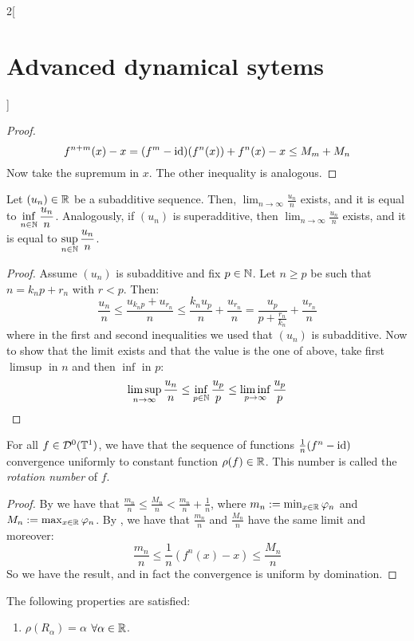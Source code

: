 \documentclass[../../../main_math.tex]{subfiles}
\begin{document}
\begin{multicols}{2}[\section{Advanced dynamical sytems}]
\begin{proof}
\begin{equation*}
      f^{n+m}(x)-x=(f^m-\mathrm{id})(f^n(x))+f^n(x)-x\leq M_m+M_n
    \end{equation*}
    Now take the supremum in $x$. The other inequality is analogous.
  \end{proof}
  \begin{lemma}\label{ADS:lema3}
    Let $(u_n)\in\mathbb{R}$ be a subadditive sequence. Then, $\displaystyle\lim_{n\to\infty}\frac{u_n}{n}$ exists, and it is equal to $\displaystyle\inf_{n\in\mathbb{N}}\frac{u_n}{n}$. Analogously, if $(u_n)$ is superadditive, then $\displaystyle\lim_{n\to\infty}\frac{u_n}{n}$ exists, and it is equal to $\displaystyle\sup_{n\in\mathbb{N}}\frac{u_n}{n}$.
  \end{lemma}
  \begin{proof}
    Assume $(u_n)$ is subadditive and fix $p\in\mathbb{N}$. Let $n\geq p$ be such that $n=k_np+r_n$ with $r<p$. Then:
    $$
      \frac{u_n}{n}\leq \frac{u_{k_np}+u_{r_n}}{n}\leq \frac{k_nu_p}{n}+\frac{u_{r_n}}{n}=\frac{u_p}{p+\frac{r_n}{k_n}}+\frac{u_{r_n}}{n}
    $$
    where in the first and second inequalities we used that $(u_n)$ is subadditive. Now to show that the limit exists and that the value is the one of above, take first $\limsup$ in $n$ and then $\inf$ in $p$:
    $$
      \limsup_{n\to\infty}\frac{u_n}{n}\leq \inf_{p\in\mathbb{N}}\frac{u_p}{p}\leq \liminf_{p\to\infty}\frac{u_p}{p}
    $$
  \end{proof}
  \begin{theorem}
    For all $f\in \mathcal{D}^0(\mathbb{T}^1)$, we have that the sequence of functions $\frac{1}{n}(f^n-\mathrm{id})$ convergence uniformly to constant function $\rho(f)\in\mathbb{R}$. This number is called the \emph{rotation number} of $f$.
  \end{theorem}
  \begin{proof}
    By  we have that $\frac{m_n}{n}\leq \frac{M_n}{n}< \frac{m_n}{n}+\frac{1}{n}$, where $m_n:= \min_{x\in\mathbb{R}}\varphi_n$ and $M_n:= \max_{x\in\mathbb{R}}\varphi_n$. By , we have that $\frac{m_n}{n}$ and $\frac{M_n}{n}$ have the same limit and moreover:
    $$
      \frac{m_n}{n}\leq \frac{1}{n}(f^n(x)-x)\leq \frac{M_n}{n}
    $$
    So we have the result, and in fact the convergence is uniform by domination.
  \end{proof}
  \begin{proposition}
    The following properties are satisfied:
    \begin{enumerate}
      \item $\rho(R_\alpha)=\alpha$ $\forall\alpha\in\mathbb{R}$.

\end{enumerate}
\end{proposition}
\end{multicols}
\end{document}
